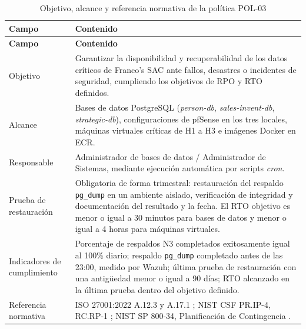 \documentclass[11pt, a4paper, oneside]{report}
\begin{document}
\normalsize

\renewcommand{\arraystretch}{1.3}
\footnotesize
{}

\begin{xltabular}{\textwidth}{@{}|L{2.6cm}|X|@{}}
\caption{Objetivo, alcance y referencia normativa de la política POL-03}
\label{tab:pol03_complemento} \\

\parbox[c][1.1cm][c]{\linewidth}{\centering\color{white}\bfseries\small Campo} &
\parbox[c][1.1cm][c]{\linewidth}{\centering\color{white}\bfseries\small Contenido} \\ \hline
\endfirsthead

\parbox[c][1.1cm][c]{\linewidth}{\centering\color{white}\bfseries\small Campo} &
\parbox[c][1.1cm][c]{\linewidth}{\centering\color{white}\bfseries\small Contenido} \\ \hline
\endhead

\hline
\endfoot

{\small Objetivo} & {\small Garantizar la disponibilidad y recuperabilidad de los datos críticos de Franco's SAC ante fallos, desastres o incidentes de seguridad, cumpliendo los objetivos de RPO y RTO definidos.} \\ \hline

{\small Alcance} & {\small Bases de datos PostgreSQL (\textit{person-db}, \textit{sales-invent-db}, \textit{strategic-db}), configuraciones de pfSense en los tres locales, máquinas virtuales críticas de H1 a H3 e imágenes Docker en ECR.} \\ \hline

{\small Responsable} & {\small Administrador de bases de datos / Administrador de Sistemas, mediante ejecución automática por scripts \textit{cron}.} \\ \hline

{\small Prueba de restauración} & {\small Obligatoria de forma trimestral: restauración del respaldo \texttt{pg\_dump} en un ambiente aislado, verificación de integridad y documentación del resultado y la fecha. El RTO objetivo es menor o igual a 30 minutos para bases de datos y menor o igual a 4 horas para máquinas virtuales.} \\ \hline

{\small Indicadores de cumplimiento} & {\small Porcentaje de respaldos N3 completados exitosamente igual al 100\% diario; respaldo \texttt{pg\_dump} completado antes de las 23:00, medido por Wazuh; última prueba de restauración con una antigüedad menor o igual a 90 días; RTO alcanzado en la última prueba dentro del objetivo definido.} \\ \hline

{\small Referencia normativa} & {\small ISO 27001:2022 A.12.3 y A.17.1 \citep{iso27001}; NIST CSF PR.IP-4, RC.RP-1 \citep{nistcsf}; NIST SP 800-34, Planificación de Contingencia \citep{nist80034}.} \\ \hline

\end{xltabular}
\end{document}
